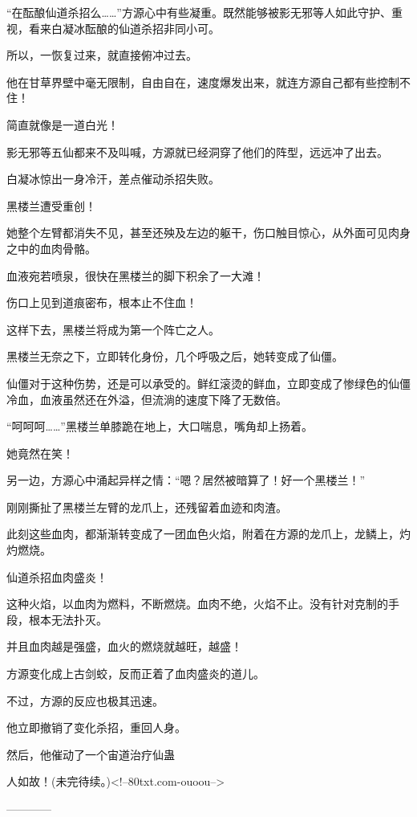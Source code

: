 \begin{this_body}
“在酝酿仙道杀招么……”方源心中有些凝重。既然能够被影无邪等人如此守护、重视，看来白凝冰酝酿的仙道杀招非同小可。

所以，一恢复过来，就直接俯冲过去。

他在甘草界壁中毫无限制，自由自在，速度爆发出来，就连方源自己都有些控制不住！

简直就像是一道白光！

影无邪等五仙都来不及叫喊，方源就已经洞穿了他们的阵型，远远冲了出去。

白凝冰惊出一身冷汗，差点催动杀招失败。

黑楼兰遭受重创！

她整个左臂都消失不见，甚至还殃及左边的躯干，伤口触目惊心，从外面可见肉身之中的血肉骨骼。

血液宛若喷泉，很快在黑楼兰的脚下积余了一大滩！

伤口上见到道痕密布，根本止不住血！

这样下去，黑楼兰将成为第一个阵亡之人。

黑楼兰无奈之下，立即转化身份，几个呼吸之后，她转变成了仙僵。

仙僵对于这种伤势，还是可以承受的。鲜红滚烫的鲜血，立即变成了惨绿色的仙僵冷血，血液虽然还在外溢，但流淌的速度下降了无数倍。

“呵呵呵……”黑楼兰单膝跪在地上，大口喘息，嘴角却上扬着。

她竟然在笑！

另一边，方源心中涌起异样之情：“嗯？居然被暗算了！好一个黑楼兰！”

刚刚撕扯了黑楼兰左臂的龙爪上，还残留着血迹和肉渣。

此刻这些血肉，都渐渐转变成了一团血色火焰，附着在方源的龙爪上，龙鳞上，灼灼燃烧。

仙道杀招血肉盛炎！

这种火焰，以血肉为燃料，不断燃烧。血肉不绝，火焰不止。没有针对克制的手段，根本无法扑灭。

并且血肉越是强盛，血火的燃烧就越旺，越盛！

方源变化成上古剑蛟，反而正着了血肉盛炎的道儿。

不过，方源的反应也极其迅速。

他立即撤销了变化杀招，重回人身。

然后，他催动了一个宙道治疗仙蛊

人如故！(未完待续。)<!--80txt.com-ouoou-->

------------

\end{this_body}

